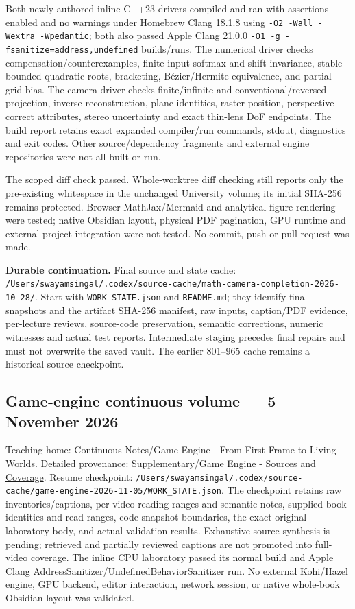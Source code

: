 Both newly authored inline C++23 drivers compiled and ran with assertions enabled and no warnings under Homebrew Clang 18.1.8 using \texttt{-O2\ -Wall\ -Wextra\ -Wpedantic}; both also passed Apple Clang 21.0.0 \texttt{-O1\ -g\ -fsanitize=address,undefined} builds/runs. The numerical driver checks compensation/counterexamples, finite-input softmax and shift invariance, stable bounded quadratic roots, bracketing, Bézier/Hermite equivalence, and partial-grid bias. The camera driver checks finite/infinite and conventional/reversed projection, inverse reconstruction, plane identities, raster position, perspective-correct attributes, stereo uncertainty and exact thin-lens DoF endpoints. The build report retains exact expanded compiler/run commands, stdout, diagnostics and exit codes. Other source/dependency fragments and external engine repositories were not all built or run.

The scoped diff check passed. Whole-worktree diff checking still reports only the pre-existing whitespace in the unchanged University volume; its initial SHA-256 remains protected. Browser MathJax/Mermaid and analytical figure rendering were tested; native Obsidian layout, physical PDF pagination, GPU runtime and external project integration were not tested. No commit, push or pull request was made.

\textbf{Durable continuation.} Final source and state cache: \texttt{/Users/swayamsingal/.codex/source-cache/math-camera-completion-2026-10-28/}. Start with \texttt{WORK\_STATE.json} and \texttt{README.md}; they identify final snapshots and the artifact SHA-256 manifest, raw inputs, caption/PDF evidence, per-lecture reviews, source-code preservation, semantic corrections, numeric witnesses and actual test reports. Intermediate staging precedes final repairs and must not overwrite the saved vault. The earlier 801--965 cache remains a historical source checkpoint.

\subsection{Game-engine continuous volume --- 5 November 2026}\label{appendix-a103e7846d21-game-engine-continuous-volume-5-november-2026}

Teaching home: {Continuous Notes/Game Engine - From First Frame to Living Worlds}. Detailed provenance: \hyperref[appendix-877738f6f4d2]{Supplementary/Game Engine - Sources and Coverage}. Resume checkpoint: \texttt{/Users/swayamsingal/.codex/source-cache/game-engine-2026-11-05/WORK\_STATE.json}. The checkpoint retains raw inventories/captions, per-video reading ranges and semantic notes, supplied-book identities and read ranges, code-snapshot boundaries, the exact original laboratory body, and actual validation results. Exhaustive source synthesis is pending; retrieved and partially reviewed captions are not promoted into full-video coverage. The inline CPU laboratory passed its normal build and Apple Clang AddressSanitizer/UndefinedBehaviorSanitizer run. No external Kohi/Hazel engine, GPU backend, editor interaction, network session, or native whole-book Obsidian layout was validated.


